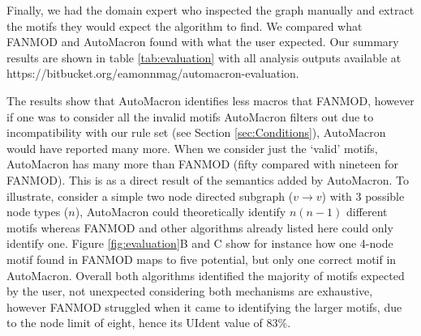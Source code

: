 Finally, we had the domain expert who inspected the graph manually and extract the motifs they would expect the algorithm to find. We compared what FANMOD and AutoMacron found with what the user expected. Our summary results are shown in table \ref{tab:evaluation} with all analysis outputs available at https://bitbucket.org/eamonnmag/automacron-evaluation.

\begin{table}[!t]
\centering
\caption{Results of motif identification by the domain expert, FANMOD and AutoMacron. Analysis included: \textbf{MIdent} - the ability of the domain expert to identify motif pictograms generated by the algorithms and match them to the original graph; and \textbf{UIdent} -  the percentage of motifs found by the algorithm with respect to the number identified manually by the domain expert.}
\vspace{1mm}
\vspace{-3mm}
\label{tab:evaluation}
\end{table}

The results show that AutoMacron identifies less macros that FANMOD, however if one was to consider all the invalid motifs AutoMacron filters out due to incompatibility with our rule set (see Section \ref{sec:Conditions}), AutoMacron would have reported many more. When we consider just the `valid' motifs, AutoMacron has many more than FANMOD (fifty compared with nineteen for FANMOD). 
This is as a direct result of the semantics added by AutoMacron. To illustrate, consider a simple two node directed subgraph ($v \rightarrow v$) with 3 possible node types ($n$), AutoMacron could theoretically identify $n(n-1)$ different motifs whereas FANMOD and other algorithms already listed here could only identify one. Figure \ref{fig:evaluation}B and C show for instance how one 4-node motif found in FANMOD maps to five potential, but only one correct motif in AutoMacron. Overall both algorithms identified the majority of motifs expected by the user, not unexpected considering both mechanisms are exhaustive, however FANMOD struggled when it came to identifying the larger motifs, due to the node limit of eight, hence its UIdent value of 83\%. 


